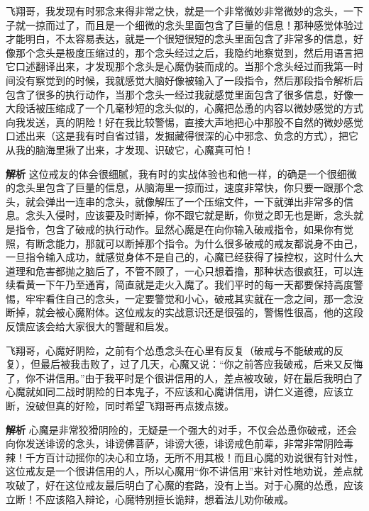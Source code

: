 \begin{case}[压缩过的念头]
    飞翔哥，我发现有时邪念来得非常之快，就是一个非常微妙非常微妙的念头，一下子就一掠而过了，而且是一个细微的念头里面包含了巨量的信息！那种感觉体验过才能明白，不太容易表达，就是一个很短很短的念头里面包含了非常多的信息，好像那个念头是极度压缩过的，那个念头经过之后，我隐约地察觉到，然后用语言把它口述翻译出来，才发现那个念头是心魔伪装而成的。当那个念头经过而我第一时间没有察觉到的时候，我就感觉大脑好像被输入了一段指令，然后那段指令解析后包含了很多的执行动作，当那个念头一经过我就感觉里面包含了很多信息，好像一大段话被压缩成了一个几毫秒短的念头似的，心魔把怂恿的内容以微妙感觉的方式向我发送，真的阴险！好在我比较警惕，直接大声地把心中那股不自然的微妙感觉口述出来（这是我有时自省过错，发掘藏得很深的心中邪念、负念的方式），把它从我的脑海里揪了出来，才发现、识破它，心魔真可怕！

    \textbf{解析} 这位戒友的体会很细腻，我有时的实战体验也和他一样，的确是一个很细微的念头里包含了巨量的信息，从脑海里一掠而过，速度非常快，你只要一跟那个念头，就会弹出一连串的念头，就像解压了一个压缩文件，一下就弹出非常多的信息。念头入侵时，应该要及时断掉，你不跟它就是断，你觉之即无也是断，念头就是指令，包含了破戒的执行动作。显然心魔是在向你输入破戒指令，如果你有觉照，有断念能力，那就可以断掉那个指令。为什么很多破戒的戒友都说身不由己，一旦指令输入成功，就感觉身体不是自己的，心魔已经获得了操控权，这时什么大道理和危害都抛之脑后了，不管不顾了，一心只想着撸，那种状态很疯狂，可以连续看黄一下午乃至通宵，简直就是走火入魔了。我们平时的每一天都要保持高度警惕，牢牢看住自己的念头，一定要警觉和小心，破戒其实就在一念之间，那一念没断掉，就会被心魔附体。这位戒友的实战意识还是很强的，警惕性很高，他的这段反馈应该会给大家很大的警醒和启发。
\end{case}

\begin{case}[狡猾阴险毒辣的心魔]
    飞翔哥，心魔好阴险，之前有个怂恿念头在心里有反复（破戒与不能破戒的反复），但最后被我击败了，过了几天，心魔又说：“你之前答应我破戒，后来又反悔了，你不讲信用。”由于我平时是个很讲信用的人，差点被攻破，好在最后我明白了心魔就如同二战时阴险的日本鬼子，不应该和心魔讲信用，讲仁义道德，应该立断，没破但真的好险，同时希望飞翔哥再点拨点拨。

    \textbf{解析} 心魔是非常狡猾阴险的，无疑是一个强大的对手，不仅会怂恿你破戒，还会向你发送诽谤的念头，诽谤佛菩萨，诽谤大德，诽谤戒色前辈，非常非常阴险毒辣！千方百计动摇你的决心和立场，无所不用其极！而且心魔的劝说很有针对性，这位戒友是一个很讲信用的人，所以心魔用“你不讲信用”来针对性地劝说，差点就攻破了，好在这位戒友最后明白了心魔的套路，没有上当。对于心魔的怂恿，应该立断！不应该陷入辩论，心魔特别擅长诡辩，想着法儿劝你破戒。
\end{case}

